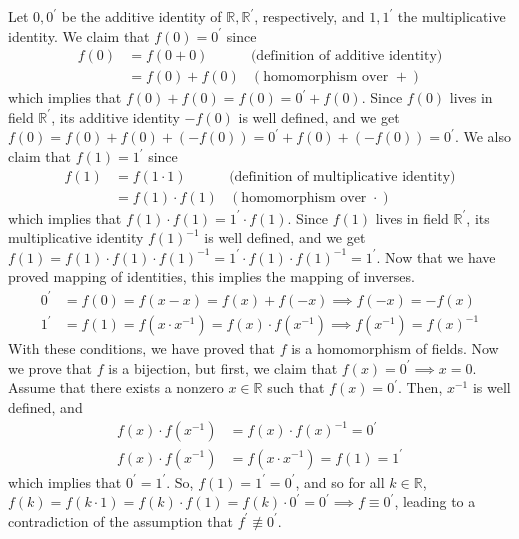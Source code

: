 \documentclass{article}
\begin{document}
    \begin{solution}
    Let $0, 0^\prime$ be the additive identity of $\mathbb{R}, \mathbb{R}^\prime$, respectively, and $1, 1^\prime$ the multiplicative identity. We claim that $f(0) = 0^\prime$ since
    \begin{align*}
        f(0) & = f(0 + 0) & \text{(definition of additive identity)} \\
        & = f(0) + f(0) & (\text{homomorphism over } + )
    \end{align*}
    which implies that $f(0) + f(0) = f(0) = 0^\prime + f(0) $. Since $f(0)$ lives in field $\mathbb{R}^\prime$, its additive identity $-f(0)$ is well defined, and we get $f(0) = f(0) + f(0) + (-f(0)) = 0^\prime + f(0) + (-f(0)) = 0^\prime$. We also claim that $f(1) = 1^\prime$ since 
    \begin{align*}
        f(1) & = f(1 \cdot 1) & \text{(definition of multiplicative identity)} \\
        & = f(1) \cdot f(1) & (\text{homomorphism over } \cdot ) 
    \end{align*}
    which implies that $f(1) \cdot f(1) = 1^\prime \cdot f(1)$. Since $f(1)$ lives in field $\mathbb{R}^\prime$, its multiplicative identity $f(1)^{-1}$ is well defined, and we get $f(1) = f(1) \cdot f(1) \cdot f(1)^{-1} = 1^\prime \cdot f(1) \cdot f(1)^{-1} = 1^\prime$. Now that we have proved mapping of identities, this implies the mapping of inverses. 
    \begin{align*}
        0^\prime & = f(0) = f(x - x) = f(x) + f(-x) \implies f(-x) = -f(x) \\
        1^\prime & = f(1) = f(x \cdot x^{-1}) = f(x) \cdot f(x^{-1}) \implies f(x^{-1}) = f(x)^{-1}
    \end{align*}
    With these conditions, we have proved that $f$ is a homomorphism of fields. Now we prove that $f$ is a bijection, but first, we claim that $f(x) = 0^\prime \implies x = 0$. Assume that there exists a nonzero $x \in \mathbb{R}$ such that $f(x) = 0^\prime$. Then, $x^{-1}$ is well defined, and 
    \begin{align*}
        f(x) \cdot f(x^{-1}) & = f(x) \cdot f(x)^{-1} = 0^\prime \\
        f(x) \cdot f(x^{-1}) & = f(x \cdot x^{-1}) = f(1) = 1^\prime 
    \end{align*}
    which implies that $0^\prime = 1^\prime$. So, $f(1) = 1^\prime = 0^\prime$, and so for all $k \in \mathbb{R}$, $f(k) =f(k \cdot 1) = f(k) \cdot f(1) = f(k) \cdot 0^\prime = 0^\prime \implies f \equiv 0^\prime$, leading to a contradiction of the assumption that $f^\prime \not\equiv 0^\prime$. 

\end{solution}
\end{document}

